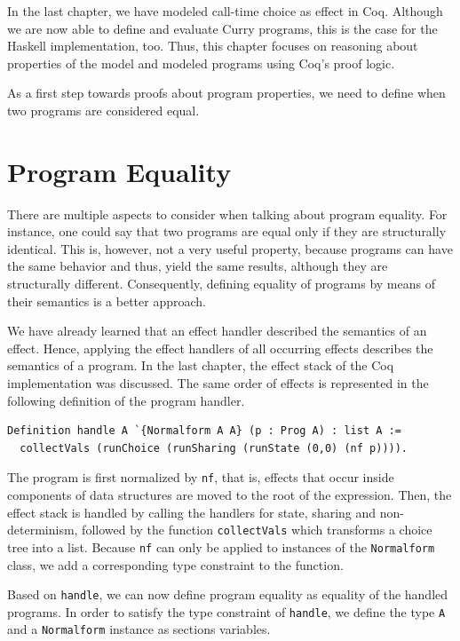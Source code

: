 \documentclass[a4paper, 11pt, fleqn, twoside]{scrreprt}
\newcommand{\cinl}[1]{\texttt{#1}}
\begin{document}
In the last chapter, we have modeled call-time choice as effect in Coq.
Although we are now able to define and evaluate Curry programs, this is the case for the Haskell implementation, too.
Thus, this chapter focuses on reasoning about properties of the model and modeled programs using Coq's proof logic.

As a first step towards proofs about program properties, we need to define when two programs are considered equal.

\section{Program Equality}

There are multiple aspects to consider when talking about program equality.
For instance, one could say that two programs are equal only if they are structurally identical.
This is, however, not a very useful property, because programs can have the same behavior and thus, yield the same results, although they are structurally different.
Consequently, defining equality of programs by means of their semantics is a better approach.

We have already learned that an effect handler described the semantics of an effect.
Hence, applying the effect handlers of all occurring effects describes the semantics of a program.
In the last chapter, the effect stack of the Coq implementation was discussed.
The same order of effects is represented in the following definition of the program handler.

\begin{verbatim}
Definition handle A `{Normalform A A} (p : Prog A) : list A :=
  collectVals (runChoice (runSharing (runState (0,0) (nf p)))).
\end{verbatim}

The program is first normalized by \cinl{nf}, that is, effects that occur inside components of data structures are moved to the root of the expression.
Then, the effect stack is handled by calling the handlers for state, sharing and non-determinism, followed by the function \cinl{collectVals} which transforms a choice tree into a list.
Because \cinl{nf} can only be applied to instances of the \cinl{Normalform} class, we add a corresponding type constraint to the function.

Based on \cinl{handle}, we can now define program equality as equality of the handled programs.
In order to satisfy the type constraint of \cinl{handle}, we define the type \cinl{A} and a \cinl{Normalform} instance as sections variables.
\end{document}
